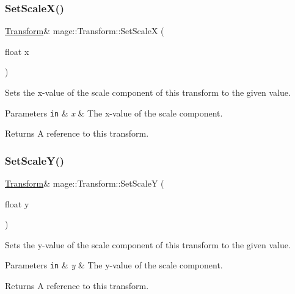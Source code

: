 \subsubsection{\texorpdfstring{Set\+Scale\+X()}{SetScaleX()}}
{\footnotesize\ttfamily \hyperlink{structmage_1_1_transform}{Transform}\& mage\+::\+Transform\+::\+Set\+ScaleX (\begin{DoxyParamCaption}\item[{float}]{x }\end{DoxyParamCaption})}

Sets the x-\/value of the scale component of this transform to the given value.


\begin{DoxyParams}[1]{Parameters}
\mbox{\tt in}  & {\em x} & The x-\/value of the scale component. \\
\hline
\end{DoxyParams}
\begin{DoxyReturn}{Returns}
A reference to this transform. 
\end{DoxyReturn}
\hypertarget{structmage_1_1_transform_adfd62325eddaf2e5f349f4c785564a37}{}\label{structmage_1_1_transform_adfd62325eddaf2e5f349f4c785564a37} 
\subsubsection{\texorpdfstring{Set\+Scale\+Y()}{SetScaleY()}}
{\footnotesize\ttfamily \hyperlink{structmage_1_1_transform}{Transform}\& mage\+::\+Transform\+::\+Set\+ScaleY (\begin{DoxyParamCaption}\item[{float}]{y }\end{DoxyParamCaption})}

Sets the y-\/value of the scale component of this transform to the given value.


\begin{DoxyParams}[1]{Parameters}
\mbox{\tt in}  & {\em y} & The y-\/value of the scale component. \\
\hline
\end{DoxyParams}
\begin{DoxyReturn}{Returns}
A reference to this transform. 
\end{DoxyReturn}
\hypertarget{structmage_1_1_transform_aa81c14d27155d26a0ea75b68d6b34d46}{}\label{structmage_1_1_transform_aa81c14d27155d26a0ea75b68d6b34d46} 
